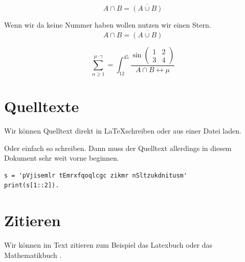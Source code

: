 \documentclass[fontsize=11]{scrartcl}
\begin{document}
	\begin{equation}
		A\cap B = \overline{ (A\cup B)}
	\end{equation}
	
	Wenn wir da keine Nummer haben wollen nutzen wir einen Stern.
	\begin{equation*}
	A\cap B = \overline{ (A\cup B)}
	\end{equation*}
	
	\begin{equation}
		\sum_{\alpha\geq 1}^{\mu \cdot \gamma} = \int_{12}^{45} \frac{\sin{\begin{pmatrix}
		1 & 2 \\
		3 & 4
		\end{pmatrix}}}{A\cap B\leftrightarrow \mu}
	\end{equation}
	
	
	\section{Quelltexte}
	Wir können Quelltext direkt in \LaTeX schreiben oder aus einer Datei laden.
	

	Oder einfach so schreiben. Dann muss der Quelltext allerdings in diesem Dokument sehr weit vorne beginnen.
	\begin{lstlisting}[caption=Genau der gleiche Quellcode]
s = 'pVjisemlr tEmrxfqoqlcgc zikmr nSltzukdnitusm'
print(s[1::2]).
	\end{lstlisting}
	
	
	\section{Zitieren}
	Wir können im Text zitieren zum Beispiel das Latexbuch \cite{Hed09} oder das Mathematikbuch \cite{Tes08}.
	
	
	\listoffigures
	
	\printbibliography 
	








	
\end{document}
